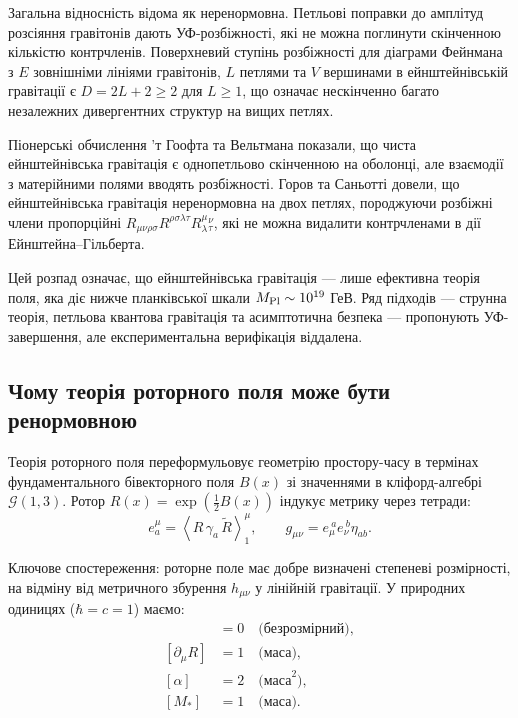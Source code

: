 \documentclass[11pt,a4paper]{article}
\numberwithin{equation}{section}
\theoremstyle{plain}
\theoremstyle{definition}
\theoremstyle{remark}
\newcommand{\Cl}{\mathcal{G}}               %
\newcommand{\rev}[1]{\widetilde{#1}}        %
\newcommand{\grade}[2]{\left\langle #1 \right\rangle_{#2}}
\begin{document}
Загальна відносність відома як неренормовна. Петльові поправки до амплітуд розсіяння гравітонів дають УФ-розбіжності, які не можна поглинути скінченною кількістю контрчленів. Поверхневий ступінь розбіжності для діаграми Фейнмана з $E$ зовнішніми лініями гравітонів, $L$ петлями та $V$ вершинами в ейнштейнівській гравітації є $D=2L+2\ge 2$ для $L\ge 1$, що означає нескінченно багато незалежних дивергентних структур на вищих петлях.

Піонерські обчислення ’т Гоофта та Вельтмана показали, що чиста ейнштейнівська гравітація є однопетльово скінченною на оболонці, але взаємодії з матерійними полями вводять розбіжності. Горов та Саньотті довели, що ейнштейнівська гравітація неренормовна на двох петлях, породжуючи розбіжні члени пропорційні $R_{\mu\nu\rho\sigma}R^{\rho\sigma\lambda\tau}R_\lambda^\mu{}_\tau^\nu$, які не можна видалити контрчленами в дії Ейнштейна–Гільберта.

Цей розпад означає, що ейнштейнівська гравітація — лише ефективна теорія поля, яка діє нижче планківської шкали $M_{\rm Pl}\sim 10^{19}$ ГеВ. Ряд підходів — струнна теорія, петльова квантова гравітація та асимптотична безпека — пропонують УФ-завершення, але експериментальна верифікація віддалена.

\subsection{Чому теорія роторного поля може бути ренормовною}

Теорія роторного поля переформульовує геометрію простору-часу в термінах фундаментального бівекторного поля $B(x)$ зі значеннями в кліфорд-алгебрі $\Cl(1,3)$. Ротор $R(x)=\exp(\tfrac12 B(x))$ індукує метрику через тетради:
\begin{equation}
e_a^\mu = \grade{R\,\gamma_a\,\rev{R}}{1}^\mu, \qquad g_{\mu\nu}=e_\mu^{\ a}e_\nu^{\ b}\eta_{ab}.
\label{eq:metric-rotor}
\end{equation}

Ключове спостереження: роторне поле має добре визначені степеневі розмірності, на відміну від метричного збурення $h_{\mu\nu}$ у лінійній гравітації. У природних одиницях ($\hbar=c=1$) маємо:
\begin{align}
[R] &= 0 \quad\text{(безрозмірний)}, \label{eq:dim-R}\\
[\partial_\mu R] &= 1 \quad\text{(маса)}, \label{eq:dim-dR}\\
[\alpha] &= 2 \quad\text{(маса}^2\text{)}, \label{eq:dim-alpha}\\
[M_*] &= 1 \quad\text{(маса)}.\label{eq:dim-Mstar}
\end{align}
\end{document}
